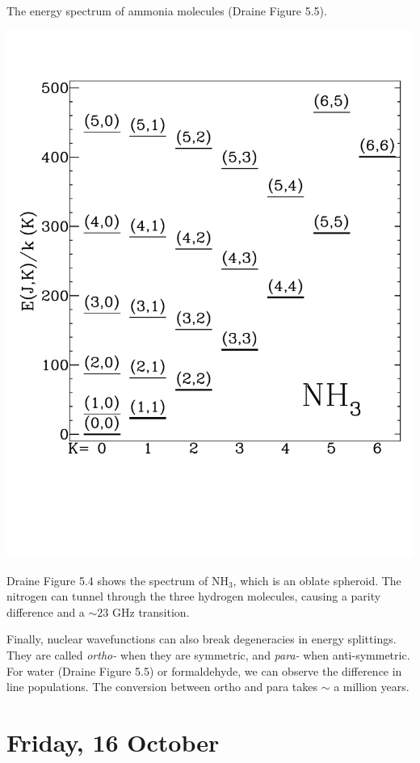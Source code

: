 \documentclass{tufte-handout}
\begin{document}
\begin{marginfigure}
\caption{The energy spectrum of ammonia molecules (Draine Figure 5.5).}
\includegraphics[]{ism_figures/Draine-5_4}
\end{marginfigure}

Draine Figure 5.4 shows the spectrum of NH$_3$, which is an oblate spheroid. The nitrogen can tunnel through the three hydrogen molecules, causing a parity difference and a $\sim 23$ GHz transition.

Finally, nuclear wavefunctions can also break degeneracies in energy splittings. They are called \textit{ortho-} when they are symmetric, and \textit{para-} when anti-symmetric. For water (Draine Figure 5.5) or formaldehyde, we can observe the difference in line populations. The conversion between ortho and para takes $\sim$ a million years. 


\section{Friday, 16 October}
\end{document}
